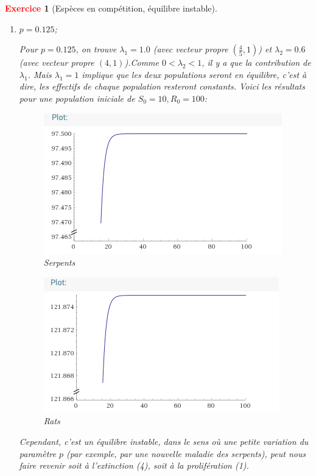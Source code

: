 \documentclass[11pt]{article}
\theoremstyle{mythmstyle}
\newtheorem{exo}{\textcolor{red}{\textbf{Exercice}}}
\begin{document}
\begin{exo}[Espèces en compétition, équilibre instable]
\begin{enumerate}
\begin{enumerate}
\begin{solution}
      




\end{solution}
    \item $p=0.125$;
\begin{solution}
    Pour $p=0.125$, on trouve $\lambda_1= 1.0$ (avec vecteur propre $(\frac{4}{5},1)$) et $\lambda_2=0.6$ (avec vecteur propre $(4,1)$).Comme $0<\lambda_2<1$, il y a que la contribution de $\lambda_1$. Mais $\lambda_1=1$ implique que les deux populations seront en équilibre, c'est à dire, les effectifs de chaque population resteront constants. Voici les résultats pour une population iniciale de $S_0=10, R_0=100$:
    

\begin{figure}[H]
\begin{center}
\includegraphics[scale=0.5]{serpentsp0125.png}
\caption{Serpents}
\end{center}
\end{figure}
        
        \begin{figure}[H]
        \begin{center}
         \includegraphics[scale=0.5]{ratsp0125.png}
        \caption{Rats}
        \end{center}
        \end{figure}
    
    
    Cependant, c'est un équilibre instable, dans le sens où une petite variation du paramètre $p$ (par exemple, par une nouvelle maladie des serpents), peut nous faire revenir soit à l'extinction (4), soit à la prolifération (1). 
\end{solution}
\end{enumerate}
\end{enumerate}
\end{exo}
 
\end{document}
